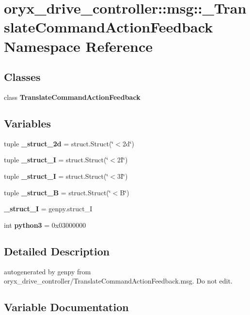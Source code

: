 \section{oryx\-\_\-drive\-\_\-controller\-:\-:msg\-:\-:\-\_\-\-Translate\-Command\-Action\-Feedback \-Namespace \-Reference}
\label{namespaceoryx__drive__controller_1_1msg_1_1__TranslateCommandActionFeedback}
\subsection*{\-Classes}
\begin{DoxyCompactItemize}
\item 
class {\bf \-Translate\-Command\-Action\-Feedback}
\end{DoxyCompactItemize}
\subsection*{\-Variables}
\begin{DoxyCompactItemize}
\item 
tuple {\bf \-\_\-struct\-\_\-2d} = struct.\-Struct(\char`\"{}$<$2d\char`\"{})
\item 
tuple {\bf \-\_\-struct\-\_\-I} = struct.\-Struct(\char`\"{}$<$2\-I\char`\"{})
\item 
tuple {\bf \-\_\-struct\-\_\-I} = struct.\-Struct(\char`\"{}$<$3\-I\char`\"{})
\item 
tuple {\bf \-\_\-struct\-\_\-\-B} = struct.\-Struct(\char`\"{}$<$\-B\char`\"{})
\item 
{\bf \-\_\-struct\-\_\-\-I} = genpy.\-struct\-\_\-\-I
\item 
int {\bf python3} = 0x03000000
\end{DoxyCompactItemize}


\subsection{\-Detailed \-Description}
\begin{DoxyVerb}autogenerated by genpy from oryx_drive_controller/TranslateCommandActionFeedback.msg. Do not edit.\end{DoxyVerb}
 

\subsection{\-Variable \-Documentation}
